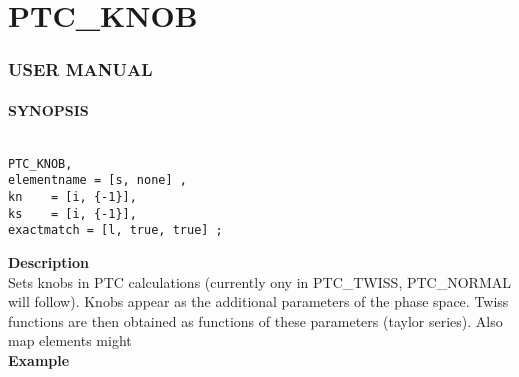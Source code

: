 


\section{PTC\_KNOB}





\subsubsection{   USER MANUAL   }


\paragraph{SYNOPSIS}
\begin{verbatim}

PTC_KNOB, 
elementname = [s, none] , 
kn    = [i, {-1}], 
ks    = [i, {-1}], 
exactmatch = [l, true, true] ; 

\end{verbatim}


\textbf{ Description }\\

 Sets knobs in PTC calculations (currently ony in PTC\_TWISS, PTC\_NORMAL will follow). Knobs appear as the additional parameters of the phase space. Twiss functions are then obtained  as functions of these parameters (taylor series). Also map elements might  \\

\textbf{ Example }\\

